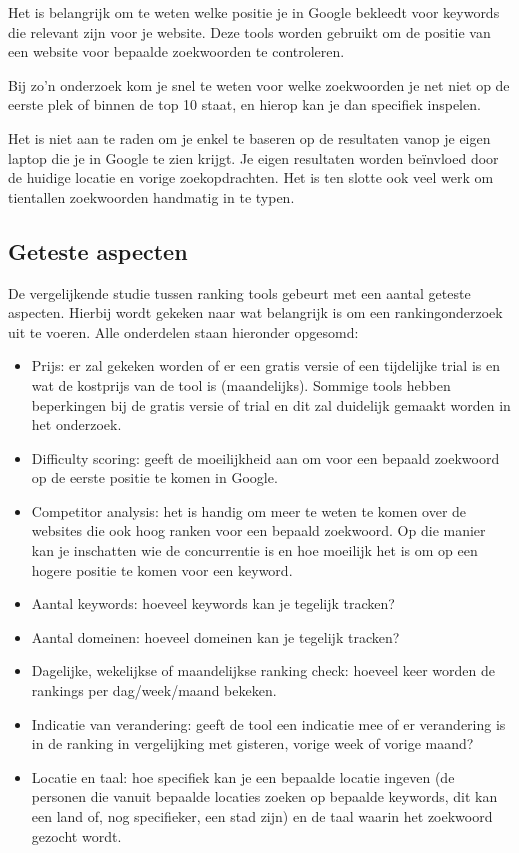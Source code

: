 Het is belangrijk om te weten welke positie je in Google bekleedt voor keywords die relevant zijn voor je website. Deze tools worden gebruikt om de positie van een website voor bepaalde zoekwoorden te controleren. 

Bij zo’n onderzoek kom je snel te weten voor welke zoekwoorden je net niet op de eerste plek of binnen de top 10 staat, en hierop kan je dan specifiek inspelen.

Het is niet aan te raden om je enkel te baseren op de resultaten vanop je eigen laptop die je in Google te zien krijgt. Je eigen resultaten worden beïnvloed door de huidige locatie en vorige zoekopdrachten. Het is ten slotte ook veel werk om tientallen zoekwoorden handmatig in te typen. 

\subsection{Geteste aspecten}
\label{ch: Geteste aspecten}

De vergelijkende studie tussen ranking tools gebeurt met een aantal geteste aspecten. Hierbij wordt gekeken naar wat belangrijk is om een rankingonderzoek uit te voeren. Alle onderdelen staan hieronder opgesomd: 

\begin{itemize}
\item Prijs: er zal gekeken worden of er een gratis versie of een tijdelijke trial is en wat de kostprijs van de tool is (maandelijks). Sommige tools hebben beperkingen bij de gratis versie of trial en dit zal duidelijk gemaakt worden in het onderzoek. 
\item Difficulty scoring: geeft de moeilijkheid aan om voor een bepaald zoekwoord op de eerste positie te komen in Google.
\item Competitor analysis: het is handig om meer te weten te komen over de websites die ook hoog ranken voor een bepaald zoekwoord. Op die manier kan je inschatten wie de concurrentie is en hoe moeilijk het is om op een hogere positie te komen voor een keyword.
\item Aantal keywords: hoeveel keywords kan je tegelijk tracken? 
\item Aantal domeinen: hoeveel domeinen kan je tegelijk tracken? 
\item Dagelijke, wekelijkse of maandelijkse ranking check: hoeveel keer worden de rankings per dag/week/maand bekeken. 
\item Indicatie van verandering: geeft de tool een indicatie mee of er verandering is in de ranking in vergelijking met gisteren, vorige week of vorige maand?
\item Locatie en taal: hoe specifiek kan je een bepaalde locatie ingeven (de personen die vanuit bepaalde locaties zoeken op bepaalde keywords, dit kan een land of, nog specifieker, een stad zijn) en de taal waarin het zoekwoord gezocht wordt.  
\end{itemize}

